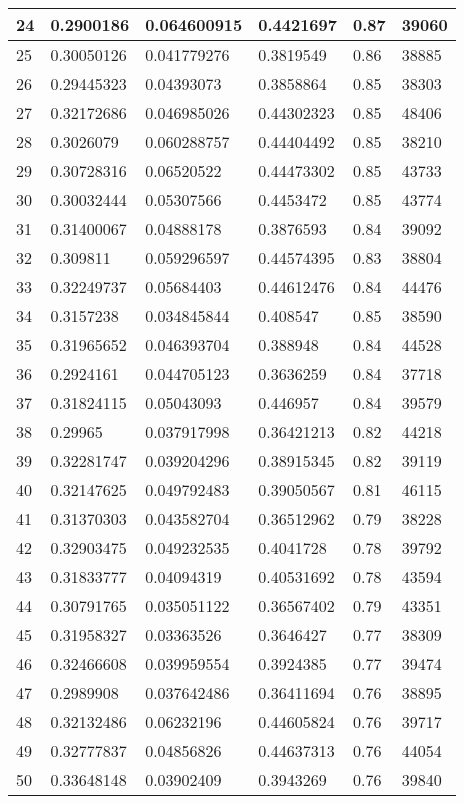\begin{longtable}{|l|l|l|l|l|l|}
24 & 0.2900186 & 0.064600915 & 0.4421697 & 0.87 & 39060 \\ \hline 
25 & 0.30050126 & 0.041779276 & 0.3819549 & 0.86 & 38885 \\ \hline 
26 & 0.29445323 & 0.04393073 & 0.3858864 & 0.85 & 38303 \\ \hline 
27 & 0.32172686 & 0.046985026 & 0.44302323 & 0.85 & 48406 \\ \hline 
28 & 0.3026079 & 0.060288757 & 0.44404492 & 0.85 & 38210 \\ \hline 
29 & 0.30728316 & 0.06520522 & 0.44473302 & 0.85 & 43733 \\ \hline 
30 & 0.30032444 & 0.05307566 & 0.4453472 & 0.85 & 43774 \\ \hline 
31 & 0.31400067 & 0.04888178 & 0.3876593 & 0.84 & 39092 \\ \hline 
32 & 0.309811 & 0.059296597 & 0.44574395 & 0.83 & 38804 \\ \hline 
33 & 0.32249737 & 0.05684403 & 0.44612476 & 0.84 & 44476 \\ \hline 
34 & 0.3157238 & 0.034845844 & 0.408547 & 0.85 & 38590 \\ \hline 
35 & 0.31965652 & 0.046393704 & 0.388948 & 0.84 & 44528 \\ \hline 
36 & 0.2924161 & 0.044705123 & 0.3636259 & 0.84 & 37718 \\ \hline 
37 & 0.31824115 & 0.05043093 & 0.446957 & 0.84 & 39579 \\ \hline 
38 & 0.29965 & 0.037917998 & 0.36421213 & 0.82 & 44218 \\ \hline 
39 & 0.32281747 & 0.039204296 & 0.38915345 & 0.82 & 39119 \\ \hline 
40 & 0.32147625 & 0.049792483 & 0.39050567 & 0.81 & 46115 \\ \hline 
41 & 0.31370303 & 0.043582704 & 0.36512962 & 0.79 & 38228 \\ \hline 
42 & 0.32903475 & 0.049232535 & 0.4041728 & 0.78 & 39792 \\ \hline 
43 & 0.31833777 & 0.04094319 & 0.40531692 & 0.78 & 43594 \\ \hline 
44 & 0.30791765 & 0.035051122 & 0.36567402 & 0.79 & 43351 \\ \hline 
45 & 0.31958327 & 0.03363526 & 0.3646427 & 0.77 & 38309 \\ \hline 
46 & 0.32466608 & 0.039959554 & 0.3924385 & 0.77 & 39474 \\ \hline 
47 & 0.2989908 & 0.037642486 & 0.36411694 & 0.76 & 38895 \\ \hline 
48 & 0.32132486 & 0.06232196 & 0.44605824 & 0.76 & 39717 \\ \hline 
49 & 0.32777837 & 0.04856826 & 0.44637313 & 0.76 & 44054 \\ \hline 
50 & 0.33648148 & 0.03902409 & 0.3943269 & 0.76 & 39840 \\ \hline 
\end{longtable}